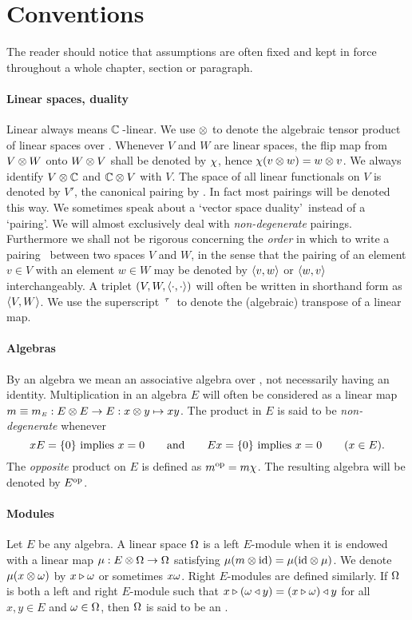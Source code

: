 
\section{Conventions}
\label{sec:conventions}

The reader should notice that assumptions are often fixed and kept in force
throughout a whole chapter, section or paragraph.

\paragraph{Linear spaces, duality}
Linear always means $\kk\,$-linear. We use $\tens$ to denote the algebraic
tensor product of linear spaces over \kk\@. Whenever $V$ and $W$ are linear
spaces, the flip map from $V \tens W$ onto $W \tens V$ shall be denoted by
$\flip$, hence $\flip(v\tens w) = w\tens v$. We always identify $V\tens\kk$ and
$\kk \tens V$ with $V$. The space of all linear functionals on $V$ is denoted
by $V'$, the canonical pairing by \pairing\@. In fact most pairings will be
denoted this way. We sometimes speak about a \lq vector space duality\rq\
instead of a \lq pairing\rq\@. We will almost exclusively deal with {\em
non-degenerate\/} pairings. Furthermore we shall not be rigorous concerning the
{\em order\/} in which to write a pairing \pairing\ between two spaces $V$ and
$W$, in the sense that the pairing of an element $v\in V$ with an element $w\in
W$ may be denoted by $\pair{v}{w}$ or $\pair{w}{v}$ interchangeably. A triplet
$(V,W,\pairing)$ will often be written in shorthand form as $\pair{V}{W}$. We
use the \mbox{superscript $\algtp$}\ to denote the (algebraic) transpose of a
linear map.


\paragraph{Algebras}
By an algebra we mean an associative algebra over \kk, not necessarily having
an identity. Multiplication in an algebra $E$ will often be considered as a
linear map $m\equiv \mult{E} : E \tens E \rarr E : x \tens y \mapsto xy$. The
product in $E$ is said to be {\em non-degenerate\/} whenever $$ xE=\{0\}
\mbox{ implies } x=0     \andspace{2em}
   Ex=\{0\}  \mbox{ implies } x=0
   \hspace{2em} (x\in E).  $$
The {\em opposite\/} product on $E$ is defined as $m\op = m\flip$. The
resulting algebra will be denoted by $E\op$.

\paragraph{Modules}
Let $E$ be any algebra. A linear space $\Om$ is a left $E$-module when it is
endowed with a linear map $\mu: E \tens \Om \rarr \Om$ satisfying $\mu (m \tens
\id) = \mu (\id \tens \mu)$. We denote $\mu(x \tens \om)$ by $x \lact \om$ or
sometimes $x\om$. Right $E$-modules are defined similarly. If $\Om$ is both a
left and right $E$-module such that $x\lact (\om \ract y) = (x\lact \om) \ract
y$ for all $x,y\in E$ and $\om \in \Om$, then $\Om$ is said to be an \Ebimod\@.

